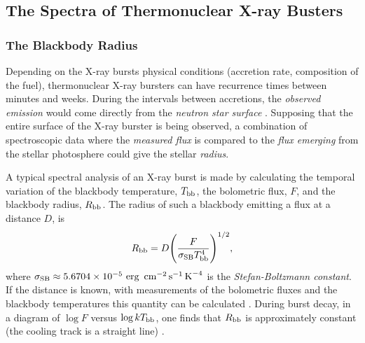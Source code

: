 {\quad




















\subsection{The Spectra of Thermonuclear X-ray Busters}

\subsubsection*{The Blackbody Radius}

Depending on the X-ray bursts physical conditions (\eg accretion rate, composition of the fuel), thermonuclear X-ray bursters can have recurrence times between minutes and weeks. During the intervals between accretions, the {\it observed emission} would come directly from the {\it neutron star surface} \cite{VAN90}. Supposing that the entire surface of the X-ray burster is being observed,  a combination of spectroscopic data where the  {\it measured flux} is compared to the {\it flux emerging} from the stellar photosphere could give  the stellar {\it radius}.   

\quad

A typical spectral analysis of an X-ray burst is made by calculating the temporal variation  of the blackbody temperature, $T_{\rm bb}$, the bolometric flux, $F$, and the blackbody radius, $R_{\rm bb}$. The radius of such a blackbody emitting a flux at a distance $D$, is
\begin{equation*}
R_{\rm bb} = D\Bigg ( \frac{F}{\sigma_{\rm SB} T_{\rm bb}^4} \Bigg)^{1/2},
\end{equation*}
where $\sigma_{\rm SB}\approx 5.6704 \times 10^{-5}\ \textrm{erg}\,\textrm{ cm}^{-2}\,\textrm{s}^{-1}\,\textrm{K}^{-4} $ is the {\it Stefan-Boltzmann constant}. If the distance is known, with measurements of the bolometric fluxes and the blackbody temperatures this quantity can be calculated \cite{BI00}. During burst decay, in a diagram of $\log F$ versus $\log kT_{\rm bb}$, one finds that $R_{\rm bb}$ is approximately constant (\ie the cooling track is a straight line) \cite{WLP80}.

}
